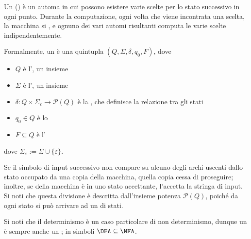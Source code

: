 \documentclass[a4paper, 12pt]{report}
\begin{document}
    \begin{frameddefn}{\NFA}
        Un \tbf{\NFA} () è un automa in cui possono esistere varie scelte per lo stato successivo in ogni punto. Durante la computazione, ogni volta che viene incontrata una scelta, la macchina si , e ognuno dei vari automi risultanti computa le varie scelte indipendentemente.

        Formalmente, un \NFA è una quintupla $(Q, \Sigma, \delta, q_0, F)$, dove

        \begin{itemize}
            \item $Q$ è l', un insieme 
            \item $\Sigma$ è l', un insieme 
            \item $\delta: Q \times \Sigma_{\varepsilon} \rightarrow \mathcal{P}(Q)$ è la , che definisce la relazione tra gli stati
            \item $q_0 \in Q$ è lo 
            \item $F \subseteq Q$ è l'
        \end{itemize}

        dove $\Sigma_{\varepsilon} := \Sigma \cup \{\varepsilon\}$.

        Se il simbolo di input successivo non compare su alcuno degli archi uscenti dallo stato occupato da una copia della macchina, quella copia cessa di proseguire; inoltre, se  della macchina è in uno stato accettante, l'\NFA accetta la stringa di input. Si noti che questa divisione è descritta dall'insieme potenza $\mathcal{P}(Q)$, poiché da ogni stato si può arrivare ad un  di stati.

        Si noti che il determinismo è un caso particolare di non determinismo, dunque un \DFA è sempre anche un \NFA; in simboli $\mathrm{\DFA} \subseteq \mathrm{\NFA}$.
    \end{frameddefn}
\end{document}
